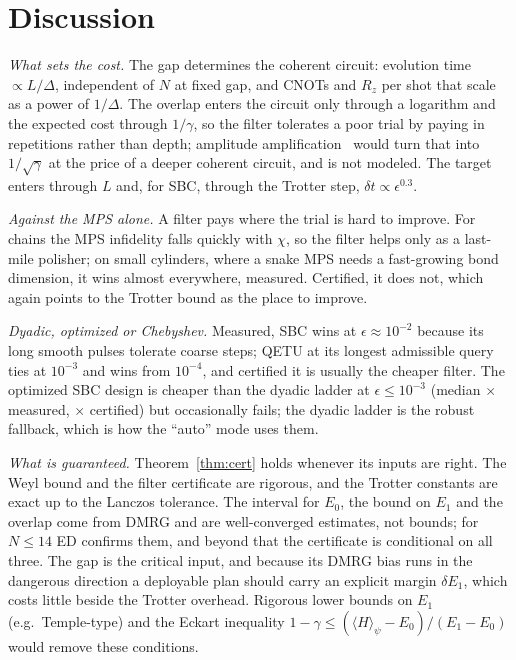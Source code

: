 \documentclass[aps,pra,twocolumn,superscriptaddress,nofootinbib]{revtex4-2}
\begin{document}
\section{Discussion}

\emph{What sets the cost.} The gap determines the coherent circuit: evolution time $\propto L/\Delta$, independent of
$N$ at fixed gap, and CNOTs and $R_z$ per shot that scale as a power of $1/\Delta$. The overlap enters the circuit
only through a logarithm and the expected cost through $1/\gamma$, so the filter tolerates a poor trial by paying in
repetitions rather than depth; amplitude amplification~\cite{Brassard2002,Yoder2014} would turn that into
$1/\sqrt\gamma$ at the price of a deeper coherent circuit, and is not modeled. The target enters through $L$ and,
for SBC, through the Trotter step, $\delta t\propto\epsilon^{0.3}$.

\emph{Against the MPS alone.} A filter pays where the trial is hard to improve. For chains the MPS infidelity
falls quickly with $\chi$, so the filter helps only as a last-mile polisher; on small cylinders, where a snake MPS
needs a fast-growing bond dimension, it wins almost everywhere, measured. Certified, it does not, which again points
to the Trotter bound as the place to improve.

\emph{Dyadic, optimized or Chebyshev.} Measured, SBC wins at $\epsilon\approx10^{-2}$ because its long smooth
pulses tolerate coarse steps; QETU at its longest admissible query ties at $10^{-3}$ and wins from $10^{-4}$, and
certified it is usually the cheaper filter. The optimized SBC design is cheaper than the dyadic ladder at
$\epsilon\le10^{-3}$ (median \odMMed$\times$ measured, \odCMed$\times$ certified) but occasionally fails; the dyadic
ladder is the robust fallback, which is how the ``auto'' mode uses them.

\emph{What is guaranteed.} Theorem~\ref{thm:cert} holds whenever its inputs are right. The Weyl bound and the filter
certificate are rigorous, and the Trotter constants are exact up to the Lanczos tolerance. The interval for $E_0$,
the bound on $E_1$ and the overlap come from DMRG and are well-converged estimates, not bounds; for $N\le14$ ED
confirms them, and beyond that the certificate is conditional on all three. The gap is the critical input, and
because its DMRG bias runs in the dangerous direction a deployable plan should carry an explicit margin $\delta E_1$,
which costs little beside the Trotter overhead. Rigorous lower bounds on $E_1$ (e.g.\ Temple-type) and the Eckart
inequality $1-\gamma\le(\langle H\rangle_\psi-E_0)/(E_1-E_0)$ would remove these conditions.
\end{document}
